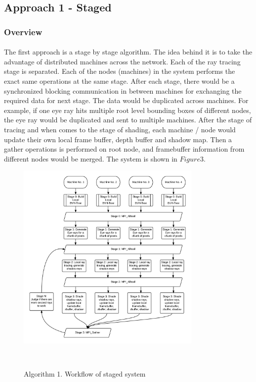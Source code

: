 \documentclass[a4paper, oneside, 10pt]{article}
\begin{document}
\subsection{Approach 1 - Staged}
\subsubsection{Overview}
\paragraph{}The first approach is a stage by stage algorithm. The idea behind it is to take the advantage of distributed machines across the network. Each of the ray tracing stage is separated. Each of the nodes (machines) in the system performs the exact same operations at the same stage. After each stage, there would be a synchronized blocking communication in between machines for exchanging the required data for next stage. The data would be duplicated across machines. For example, if one eye ray hits multiple root level bounding boxes of different nodes, the eye ray would be duplicated and sent to multiple machines. 
After the stage of tracing and when comes to the stage of shading, each machine / node would update their own local frame buffer, depth buffer and shadow map. Then a gather operations is performed on root node, and framebuffer information from different nodes would be merged.
The system is shown in $Figure 3$.
\begin{figure}[h]
\includegraphics[width=0.8\textwidth]{algo1}
\caption{Algorithm 1. Workflow of staged system}\
\end{figure}
\end{document}
